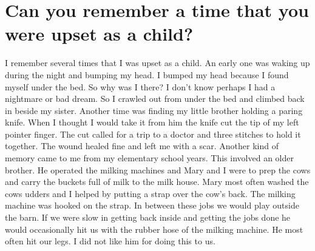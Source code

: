 \section{Can you remember a time that you were upset as a child?}
I remember several times that I was upset as a child.
An early one was waking up during the night and bumping my head.
I bumped my head because I found myself under the bed.
So why was I there? I don't know perhaps I had a nightmare or bad dream.
So I crawled out from under the bed and climbed back in beside my sister.
Another time was finding my little brother holding a paring knife.
When I thought I would take it from him the knife cut the tip of my left pointer finger.
The cut called for a trip to a doctor and three stitches to hold it together.
The wound healed fine and left me with a scar.
Another kind of memory came to me from my elementary school years.
This involved an older brother.
He operated the milking machines and Mary and I were to prep the cows and carry the buckets full of milk to the milk house.
Mary most often washed the cows udders and I helped by putting a strap over the cow's back.
The milking machine was hooked on the strap.
In between these jobs we would play outside the barn.
If we were slow in getting back inside and getting the jobs done he would occasionally hit us with the rubber hose of the milking machine.
He most often hit our legs.
I did not like him for doing this to us.







